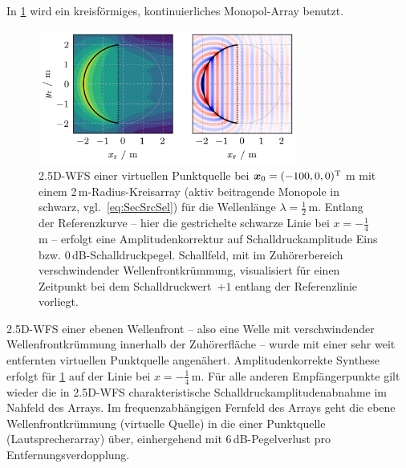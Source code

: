 In \Abb\ref{fig:wfs25d_circSSD} wird ein kreisförmiges,
kontinuierliches Monopol-Array benutzt.
%
\begin{figure}[t]
\centering
\begin{plotfigures}
\includegraphics[width=85mm]{../python/wfs25d_circSSD.png}
\end{plotfigures}
\caption{2.5D-WFS einer virtuellen Punktquelle bei $\bm{x}_\mathrm{0} = (-100,0,0)^\mathrm{T}$\,m
mit einem 2\,m-Radius-Kreisarray (aktiv beitragende Monopole in schwarz, vgl.~\eqref{eq:SecSrcSel})
für die Wellenlänge $\lambda=\frac{1}{2}$\,m.
%
Entlang der Referenzkurve -- hier die gestrichelte schwarze Linie bei
$x=-\frac{1}{4}$\,m -- erfolgt
eine Amplitudenkorrektur auf Schalldruckamplitude Eins bzw. $0$\,dB-Schalldruckpegel.
%
%
Schallfeld, mit im Zuhörerbereich verschwindender Wellenfrontkrümmung, visualisiert
für einen Zeitpunkt bei dem Schalldruckwert~$+1$ entlang der Referenzlinie vorliegt.
%
\cc
}
\label{fig:wfs25d_circSSD}
\end{figure}
%
2.5D-WFS einer ebenen Wellenfront -- also eine Welle
mit verschwindender Wellenfrontkrümmung innerhalb der Zuhörerfläche -- wurde
mit einer sehr weit entfernten virtuellen Punktquelle angenähert.
%
Amplitudenkorrekte Synthese erfolgt für \Abb\ref{fig:wfs25d_circSSD}
auf der Linie bei $x=-\frac{1}{4}$\,m.
%
Für alle anderen Empfängerpunkte gilt wieder die in 2.5D-WFS
charakteristische Schalldruckamplitudenabnahme im Nahfeld des Arrays.
%
Im frequenzabhängigen Fernfeld des Arrays geht die ebene Wellenfrontkrümmung
(virtuelle Quelle) in die einer Punktquelle (Lautsprecherarray) über,
einhergehend mit $6$\,dB-Pegelverlust pro Entfernungsverdopplung.



